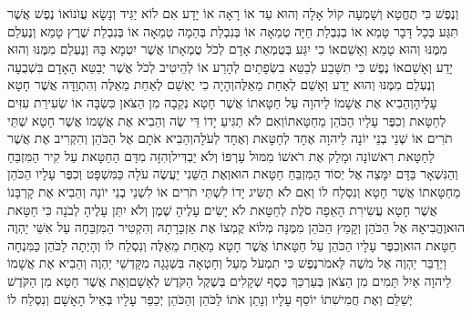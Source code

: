 \documentclass[../main/main.tex]{subfiles}
\begin{document}
\begin{multicols*}{\ncols}
וְנֶפֶשׁ כִּי תֶחֱטָא וְשָׁמְעָה קוֹל אָלָה וְהוּא עֵד אוֹ רָאָה אוֹ יָדָע אִם לוֹא יַגִּיד וְנָשָׂא עֲוֺנוֹ\PreVerseSpace{}אוֹ נֶפֶשׁ אֲשֶׁר תִּגַּע בְּכָל דָּבָר טָמֵא אוֹ בְנִבְלַת חַיָּה טְמֵאָה אוֹ בְּנִבְלַת בְּהֵמָה טְמֵאָה אוֹ בְּנִבְלַת שֶׁרֶץ טָמֵא וְנֶעְלַם מִמֶּנּוּ וְהוּא טָמֵא וְאָשֵׁם\PreVerseSpace{}אוֹ כִי יִגַּע בְּטֻמְאַת אָדָם לְכֹל טֻמְאָתוֹ אֲשֶׁר יִטְמָא בָּהּ וְנֶעְלַם מִמֶּנּוּ וְהוּא יָדַע וְאָשֵׁם\PreVerseSpace{}אוֹ נֶפֶשׁ כִּי תִשָּׁבַע לְבַטֵּא בִשְׂפָתַיִם לְהָרַע אוֹ לְהֵיטִיב לְכֹל אֲשֶׁר יְבַטֵּא הָאָדָם בִּשְׁבֻעָה וְנֶעְלַם מִמֶּנּוּ וְהוּא יָדַע וְאָשֵׁם לְאַחַת מֵאֵלֶּה\PreVerseSpace{}וְהָיָה כִי יֶאְשַׁם לְאַחַת מֵאֵלֶּה וְהִתְוַדָּה אֲשֶׁר חָטָא עָלֶיהָ\PreVerseSpace{}וְהֵבִיא אֶת אֲשָׁמוֹ לַיהוָה עַל חַטָּאתוֹ אֲשֶׁר חָטָא נְקֵבָה מִן הַצֹּאן כִּשְׂבָּה אוֹ שְׂעִירַת עִזִּים לְחַטָּאת וְכִפֶּר עָלָיו הַכֹּהֵן מֵחַטָּאתוֹ\PreVerseSpace{}וְאִם לֹא תַגִּיעַ יָדוֹ דֵּי שֶׂה וְהֵבִיא אֶת אֲשָׁמוֹ אֲשֶׁר חָטָא שְׁתֵּי תֹרִים אוֹ שְׁנֵי בְנֵי יוֹנָה לַיהוָה אֶחָד לְחַטָּאת וְאֶחָד לְעֹלָה\PreVerseSpace{}וְהֵבִיא אֹתָם אֶל הַכֹּהֵן וְהִקְרִיב אֶת אֲשֶׁר לַחַטָּאת רִאשׁוֹנָה וּמָלַק אֶת רֹאשׁוֹ מִמּוּל עָרְפּוֹ וְלֹא יַבְדִּיל\PreVerseSpace{}וְהִזָּה מִדַּם הַחַטָּאת עַל קִיר הַמִּזְבֵּחַ וְהַנִּשְׁאָר בַּדָּם יִמָּצֵה אֶל יְסוֹד הַמִּזְבֵּחַ חַטָּאת הוּא\PreVerseSpace{}וְאֶת הַשֵּׁנִי יַעֲשֶׂה עֹלָה כַּמִּשְׁפָּט וְכִפֶּר עָלָיו הַכֹּהֵן מֵחַטָּאתוֹ אֲשֶׁר חָטָא וְנִסְלַח לוֹ \ClosedSection{}וְאִם לֹא תַשִּׂיג יָדוֹ לִשְׁתֵּי תֹרִים אוֹ לִשְׁנֵי בְנֵי יוֹנָה וְהֵבִיא אֶת קָרְבָּנוֹ אֲשֶׁר חָטָא עֲשִׂירִת הָאֵפָה סֹלֶת לְחַטָּאת לֹא יָשִׂים עָלֶיהָ שֶׁמֶן וְלֹא יִתֵּן עָלֶיהָ לְבֹנָה כִּי חַטָּאת הוּא\SubEnd{}\PreVerseSpace{}וֶהֱבִיאָהּ אֶל הַכֹּהֵן וְקָמַץ הַכֹּהֵן מִמֶּנָּה מְלוֹא קֻמְצוֹ אֶת אַזְכָּרָתָהּ וְהִקְטִיר הַמִּזְבֵּחָה עַל אִשֵּׁי יַהְוֶה חַטָּאת הוּא\PreVerseSpace{}וְכִפֶּר עָלָיו הַכֹּהֵן עַל חַטָּאתוֹ אֲשֶׁר חָטָא מֵאַחַת מֵאֵלֶּה וְנִסְלַח לוֹ וְהָיְתָה לַכֹּהֵן כַּמִּנְחָה \ClosedSection{}וַיְדַבֵּר יַהְוֶה אֶל מֹשֶׁה לֵּאמֹר\PreVerseSpace{}נֶפֶשׁ כִּי תִמְעֹל מַעַל וְחָטְאָה בִּשְׁגָגָה מִקָּדְשֵׁי יַהְוֶה וְהֵבִיא אֶת אֲשָׁמוֹ לַיהוָה אַיִל תָּמִים מִן הַצֹּאן בְּעַרְכַּךְ\SubEnd{} כֶּסֶף שְׁקָלִים בְּשֶׁקֶל הַקֹּדֶשׁ לְאָשָׁם\PreVerseSpace{}וְאֵת אֲשֶׁר חָטָא מִן הַקֹּדֶשׁ יְשַׁלֵּם וְאֶת חֲמִישִׁתוֹ יוֹסֵף עָלָיו וְנָתַן אֹתוֹ לַכֹּהֵן וְהַכֹּהֵן יְכַפֵּר עָלָיו בְּאֵיל הָאָשָׁם וְנִסְלַח לוֹ\OpenSection{}\par

\end{multicols*}
\end{document}
